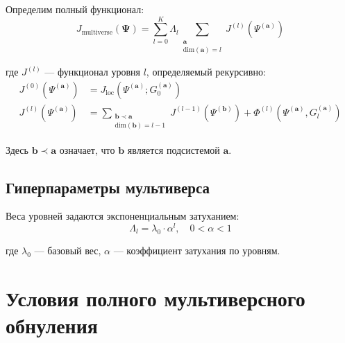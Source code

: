 \documentclass[12pt,a4paper]{article}
\newcommand{\bfPsi}{\mathbf{\Psi}}
\newcommand{\bfa}{\mathbf{a}}
\newcommand{\bfb}{\mathbf{b}}
\newcommand{\PhiFunc}{\Phi}
\begin{document}
Определим полный функционал:
\begin{equation}
J_{\text{multiverse}}(\bfPsi) = \sum_{l=0}^K \Lambda_l 
\sum_{\substack{\bfa \\ \text{dim}(\bfa)=l}} J^{(l)}(\Psi^{(\bfa)})
\end{equation}

где $J^{(l)}$ --- функционал уровня $l$, определяемый рекурсивно:
\begin{align}
J^{(0)}(\Psi^{(\bfa)}) &= J_{\text{loc}}(\Psi^{(\bfa)}; G_0^{(\bfa)}) \\
J^{(l)}(\Psi^{(\bfa)}) &= \sum_{\substack{\bfb \prec \bfa \\ \text{dim}(\bfb)=l-1}} 
J^{(l-1)}(\Psi^{(\bfb)}) + \PhiFunc^{(l)}(\Psi^{(\bfa)}, G_l^{(\bfa)})
\end{align}

Здесь $\bfb \prec \bfa$ означает, что $\bfb$ является подсистемой $\bfa$.

\subsection{Гиперпараметры мультиверса}

Веса уровней задаются экспоненциальным затуханием:
\begin{equation}
\Lambda_l = \lambda_0 \cdot \alpha^l, \quad 0 < \alpha < 1
\end{equation}

где $\lambda_0$ --- базовый вес, $\alpha$ --- коэффициент затухания по уровням.

\section{Условия полного мультиверсного обнуления}
\end{document}
